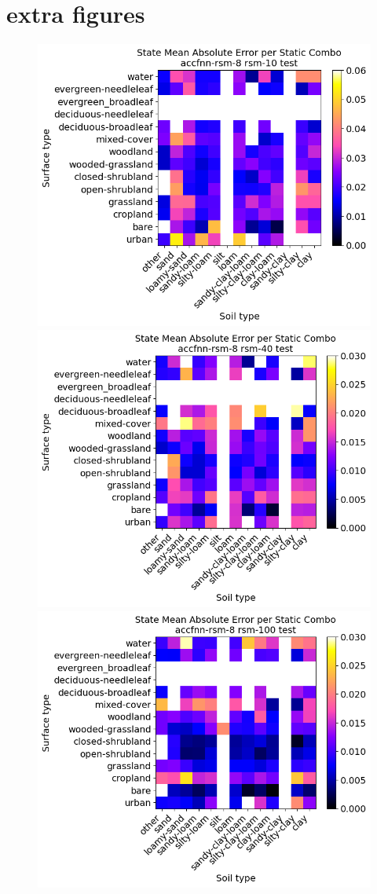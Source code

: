 \chapter{extra figures}

\begin{figure}[hp!]
    \centering

    \includegraphics[width=.32\linewidth,draft=false]{figures/static-combos/eval_test_accfnn-rsm-8_rsm-10_static-combos_abs-err_state.png}
    \includegraphics[width=.32\linewidth,draft=false]{figures/static-combos/eval_test_accfnn-rsm-8_rsm-40_static-combos_abs-err_state.png}
    \includegraphics[width=.32\linewidth,draft=false]{figures/static-combos/eval_test_accfnn-rsm-8_rsm-100_static-combos_abs-err_state.png}


\end{figure}
